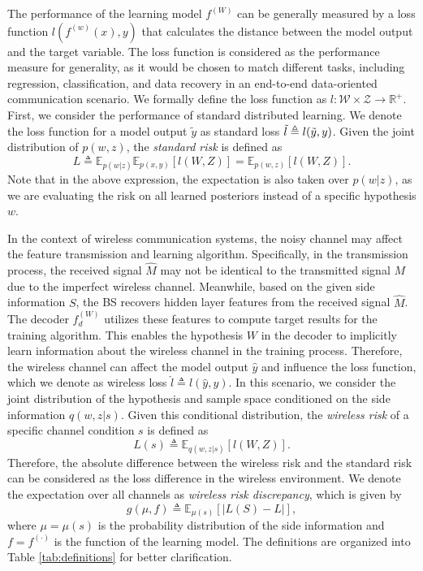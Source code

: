 \documentclass[lettersize,journal]{IEEEtran}
\newcommand{\R}{\mathbb{R}}
\newcommand{\E}{\mathbb{E}}
\theoremstyle{definition}
\theoremstyle{plain}
\begin{document}
The performance of the learning model $f^{(W)}$ can be generally measured by a loss function $l(f^{(w)}(x),y)$ that calculates the distance between the model output and the target variable.
The loss function is considered as the performance measure for generality, as it would be chosen to match different tasks, including regression, classification, and data recovery in an end-to-end data-oriented communication scenario.
We formally define the loss function as $l:\mathcal{W}\times \mathcal{Z}\to \R^+$. 
First, we consider the performance of standard distributed learning. 
We denote the loss function for a model output $\tilde{y}$ as standard loss $\Tilde{l}\triangleq l(\Tilde{y}, y)$. Given the joint distribution of $p(w,z)$, the \textit{standard risk} is defined as
\begin{equation}
    \label{equ:true_risk}
    L \triangleq \E_{p(w|z)}\E_{p(x,y)}\left[l(W,Z)\right] = \E_{p(w,z)}\left[l(W,Z)\right].
\end{equation}
Note that in the above expression, the expectation is also taken over $p(w|z)$, as we are evaluating the risk on all learned posteriors instead of a specific hypothesis $w$. 

In the context of wireless communication systems, the noisy channel may affect the feature transmission and learning algorithm.  
Specifically, in the transmission process, the received signal $\hat{M}$ may not be identical to the transmitted signal $M$ due to the imperfect wireless channel. Meanwhile, based on the given side information $S$, the BS recovers hidden layer features from the received signal $\hat{M}$. The decoder $f_d^{(W)}$ utilizes these features to compute target results for the training algorithm. This enables the hypothesis $W$ in the decoder to implicitly learn information about the wireless channel in the training process.
Therefore, the wireless channel can affect the model output $\hat{y}$ and influence the loss function, which we denote as wireless loss $\hat{l}\triangleq l(\hat{y},y)$. In this scenario, we consider the joint distribution of the hypothesis and sample space conditioned on the side information $q(w,z|s)$. 
Given this conditional distribution, the \textit{wireless risk} of a specific channel condition $s$ is defined as
\begin{equation}
    \label{equ:wireless_risk}
    L(s) \triangleq \E_{q(w, z | s)}\left[l(W,Z)\right].
\end{equation}
Therefore, the absolute difference between the wireless risk and the standard risk can be considered as the loss difference in the wireless environment. We denote the expectation over all channels as \textit{wireless risk discrepancy}, which is given by
\begin{equation}
    \label{equ:wireless_discrepancy}
    g(\mu,f) \triangleq \E_{\mu(s)}\left[| L(S) - L|\right],
\end{equation}
where $\mu=\mu(s)$ is the probability distribution of the side information and $f=f^{(\cdot)}$ is the function of the learning model.
The definitions are organized into Table \ref{tab:definitions} for better clarification.
\end{document}
